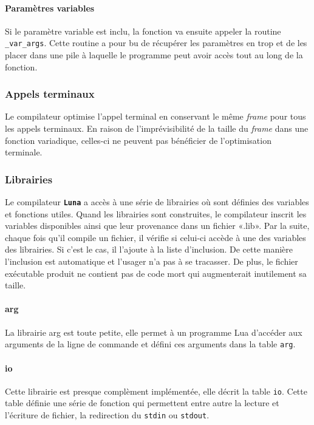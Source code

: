 \documentclass{article}
\newcommand{\luna}{\textbf{\texttt{Luna}}}
\begin{document}
\paragraph{Paramètres variables}
Si le paramètre variable est inclu, la fonction va ensuite appeler la routine \texttt{\_{}var\_{}args}. Cette routine a pour bu de récupérer les paramètres en trop et de les placer dans une pile à laquelle le programme peut avoir accès tout au long de la fonction.


\subsubsection{Appels terminaux}
Le compilateur optimise l'appel terminal en conservant le même \textit{frame} pour tous les appels terminaux. En raison de l'imprévisibilité de la taille du \textit{frame} dans une fonction variadique, celles-ci ne peuvent pas bénéficier de l'optimisation terminale.

\newpage
\subsubsection{Librairies}
Le compilateur \luna{} a accès à une série de librairies où sont définies des variables et fonctions utiles. Quand les librairies sont construites, le compilateur inscrit les variables disponibles ainsi que leur provenance dans un fichier «.lib». Par la suite, chaque fois qu'il compile un fichier, il vérifie si celui-ci accède à une des variables des librairies. Si c'est le cas, il l'ajoute à la liste d'inclusion. De cette manière l'inclusion est automatique et l'usager n'a pas à se tracasser. De plus, le fichier exécutable produit ne contient pas de code mort qui augmenterait inutilement sa taille.

\paragraph{arg}
La librairie arg est toute petite, elle permet à un programme Lua d'accéder aux arguments de la ligne de commande et défini ces arguments dans la table \texttt{arg}.

\paragraph{io}
Cette librairie est presque complèment implémentée, elle décrit la table \texttt{io}. Cette table définie une série de fonction qui permettent entre autre la lecture et l'écriture de fichier, la redirection du \texttt{stdin} ou \texttt{stdout}.
\end{document}
